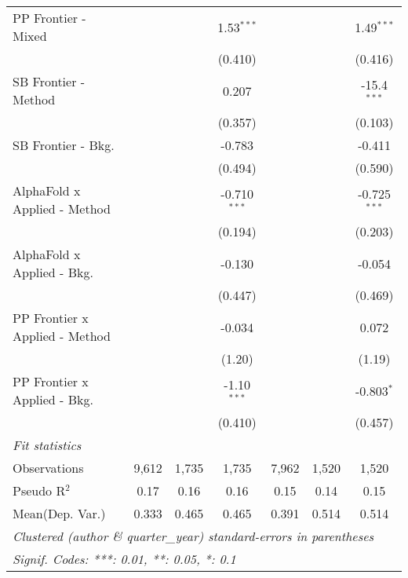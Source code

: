 \begin{tabular}{lcccccc}
   PP Frontier - Mixed            &                &                & 1.53$^{***}$   &                &                & 1.49$^{***}$\\   
                                  &                &                & (0.410)        &                &                & (0.416)\\   
   SB Frontier - Method           &                &                & 0.207          &                &                & -15.4$^{***}$\\   
                                  &                &                & (0.357)        &                &                & (0.103)\\   
   SB Frontier - Bkg.             &                &                & -0.783         &                &                & -0.411\\   
                                  &                &                & (0.494)        &                &                & (0.590)\\   
   AlphaFold x Applied - Method   &                &                & -0.710$^{***}$ &                &                & -0.725$^{***}$\\   
                                  &                &                & (0.194)        &                &                & (0.203)\\   
   AlphaFold x Applied - Bkg.     &                &                & -0.130         &                &                & -0.054\\   
                                  &                &                & (0.447)        &                &                & (0.469)\\   
   PP Frontier x Applied - Method &                &                & -0.034         &                &                & 0.072\\   
                                  &                &                & (1.20)         &                &                & (1.19)\\   
   PP Frontier x Applied - Bkg.   &                &                & -1.10$^{***}$  &                &                & -0.803$^{*}$\\   
                                  &                &                & (0.410)        &                &                & (0.457)\\   
   \midrule
   \emph{Fit statistics}\\
   Observations                   & 9,612          & 1,735          & 1,735          & 7,962          & 1,520          & 1,520\\  
   Pseudo R$^2$                   & 0.17           & 0.16           & 0.16           & 0.15           & 0.14           & 0.15\\  
Mean(Dep. Var.) & 0.333 & 0.465 & 0.465 & 0.391 & 0.514 & 0.514 \\
   \midrule \midrule
   \multicolumn{7}{l}{\emph{Clustered (author \& quarter\_year) standard-errors in parentheses}}\\
   \multicolumn{7}{l}{\emph{Signif. Codes: ***: 0.01, **: 0.05, *: 0.1}}\\
\end{tabular}
\par\endgroup
